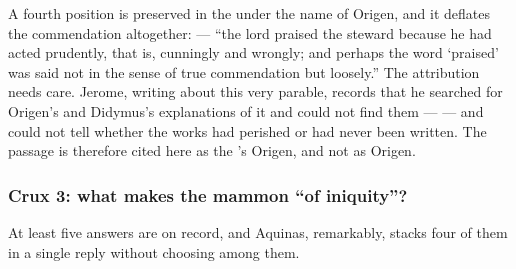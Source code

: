 A fourth position is preserved in the  under the name of
Origen, and it deflates the commendation altogether:  ---
``the lord praised the steward because he had acted prudently, that is,
cunningly and wrongly; and perhaps the word `praised' was said not in the sense
of true commendation but loosely.'' The attribution needs care. Jerome, writing
about this very parable, records that he searched for Origen's and Didymus's
explanations of it and could not find them ---  --- and could not tell whether
the works had perished or had never been written. The passage is therefore
cited here as the 's Origen, and not as Origen.

\subsubsection*{Crux 3: what makes the mammon ``of iniquity''?}

At least five answers are on record, and Aquinas, remarkably, stacks four of
them in a single reply without choosing among them.

